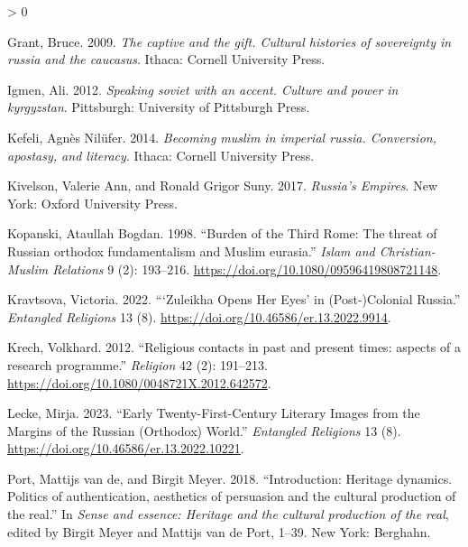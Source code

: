 \documentclass[
  english,
  a4paper,
  DIV=12,
  footlines=2.1,
  usegeometry=true]{scrartcl}
\newlength{\cslhangindent}
\newenvironment{CSLReferences}[2] %
 {%
  \setlength{\parindent}{0pt}
  \ifodd #1 \everypar{\setlength{\hangindent}{\cslhangindent}}\ignorespaces\fi
  \ifnum #2 > 0
  \setlength{\parskip}{#2\baselineskip}
  \fi
 }%
 {}
\begin{document}
\begin{CSLReferences}{1}{0}
\leavevmode{}%
Grant, Bruce. 2009. \emph{The captive and the gift. Cultural histories
of sovereignty in russia and the caucasus}. Ithaca: Cornell University
Press.

\leavevmode{}%
Igmen, Ali. 2012. \emph{Speaking soviet with an accent. Culture and
power in kyrgyzstan}. Pittsburgh: University of Pittsburgh Press.

\leavevmode{}%
Kefeli, Agnès Nilüfer. 2014. \emph{Becoming muslim in imperial russia.
Conversion, apostasy, and literacy}. Ithaca: Cornell University Press.

\leavevmode{}%
Kivelson, Valerie Ann, and Ronald Grigor Suny. 2017. \emph{Russia's
Empires}. New York: Oxford University Press.

\leavevmode{}%
Kopanski, Ataullah Bogdan. 1998. {``Burden of the Third Rome: The threat
of Russian orthodox fundamentalism and Muslim eurasia.''} \emph{Islam
and Christian-Muslim Relations} 9 (2): 193--216.
\url{https://doi.org/10.1080/09596419808721148}.

\leavevmode{}%
Kravtsova, Victoria. 2022. {``{`Zuleikha Opens Her Eyes'} in
(Post-)Colonial Russia.''} \emph{Entangled Religions} 13 (8).
\url{https://doi.org/10.46586/er.13.2022.9914}.

\leavevmode{}%
Krech, Volkhard. 2012. {``Religious contacts in past and present times:
aspects of a research programme.''} \emph{Religion} 42 (2): 191--213.
\url{https://doi.org/10.1080/0048721X.2012.642572}.

\leavevmode{}%
Lecke, Mirja. 2023. {``Early Twenty-First-Century Literary Images from
the Margins of the Russian (Orthodox) World.''} \emph{Entangled
Religions} 13 (8). \url{https://doi.org/10.46586/er.13.2022.10221}.

\leavevmode{}%
Port, Mattijs van de, and Birgit Meyer. 2018. {``Introduction: Heritage
dynamics. Politics of authentication, aesthetics of persuasion and the
cultural production of the real.''} In \emph{Sense and essence: Heritage
and the cultural production of the real}, edited by Birgit Meyer and
Mattijs van de Port, 1--39. New York: Berghahn.


\end{CSLReferences}
\end{document}
